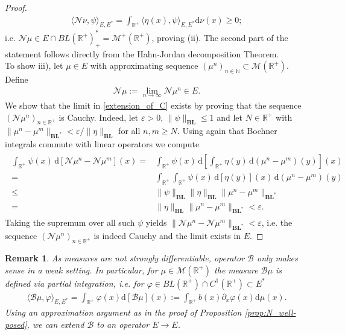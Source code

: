 \documentclass[12pt,a4paper]{amsart}
\newcommand{\ud}{\mathrm{d}}
\newtheorem{remark}[theorem]{Remark}
\newcommand{\BLN}{\mathbf{BL}}
\newcommand{\N}{\mathbb{R^{+}}}
\newcommand{\R}{\mathbb{R}}
\begin{document}
\begin{proof}
    \begin{align*}
    \langle \mathcal{N}\nu,\psi\rangle_{E,E^*}=\int_{\R^+}\langle \eta(x),\psi\rangle_{E,E^*}\ud\nu(x)\geq 0;
    \end{align*}
i.e.  $\mathcal{N}\mu\in E\cap BL(\R^+)^*_+=\mathcal{M}^+(\R^+)$, proving (ii). The second part of the statement follows directly from the Hahn-Jordan decomposition Theorem.\\
To show iii), let $\mu\in E$  with approximating sequence $(\mu^n)_{n\in \mathbb{N}}\subset \mathcal{M}(\R^+)$. Define
    \begin{align}
    \label{extension_of_C}
\mathcal{N}\mu:=\lim_{n\to\infty}\mathcal{N}\mu^n\in E.
    \end{align}
We show that the limit in \eqref{extension_of_C} exists by proving that the sequence $(\mathcal{N}\mu^n)_{n\in \N}$ is Cauchy. Indeed, let $\varepsilon>0$, $\|\psi\|_{\BLN}\leq  1$ and let $N\in \N$ with $\|\mu^n-\mu^m\|_{\BLN^*}< \varepsilon/\|\eta\|_{\BLN}$ for all $n,m\geq N$. Using again that Bochner integrals commute with linear operators we compute
    \begin{align}
    \label{C_Cauchy}
    \begin{split}
\int_{\R^+}\psi(x)\,\ud\left[\mathcal{N}\mu^n-\mathcal{N}\mu^m\right](x)
=&\int_{\R^+}\psi(x)\,\ud\left[ \int_{\R^+}\eta(y)\,\ud(\mu^n-\mu^m)(y)\right](x)\\
=&\int_{\R^+}\int_{\R^+}\psi(x)\,\ud [\eta(y)](x)\,\ud(\mu^n-\mu^m)(y)\\
\leq&\|\psi\|_{\BLN}\|\eta\|_{\BLN}\|\mu^n-\mu^m\|_{\BLN^*}\\
=&\|\eta\|_{\BLN}\|\mu^n-\mu^m\|_{\BLN^*}<\varepsilon.
\end{split}
    \end{align}
Taking the supremum over all such $\psi$ yields $\|\mathcal{N}\mu^n-\mathcal{N}\mu^m\|_{\BLN^*}<\varepsilon$, i.e. the sequence $(\mathcal{N}\mu^n)_{n\in \N}$ is indeed Cauchy and the limit exists in $E$. 
\end{proof}

\begin{remark}
\label{rem:transport_for_measures}
As measures are not strongly differentiable, operator $\mathcal{B}$ only makes sense in a weak setting. In particular, for $\mu\in \mathcal{M}(\R^+)$ the measure  $\mathcal{B}\mu$ is defined via partial integration, i.e. for $\varphi\in BL(\R^+)\cap C^1(\R^+)\subset E^*$ 
    \begin{align*}
    \langle \mathcal{B} \mu,\varphi\rangle_{E,E^*}= \int_{\R^+}\varphi(x)\ud[\mathcal{B}\mu](x):=\int_{\R^+}b(x)\partial_x\varphi(x)\ud \mu(x).
    \end{align*}
Using an approximation argument as in the proof of Proposition \ref{prop:N_well-posed}, we can extend $\mathcal{B}$ to an operator $E\to E$.
\end{remark}
\end{document}
